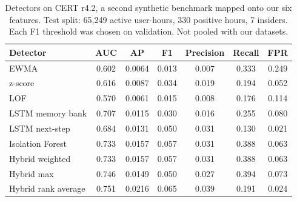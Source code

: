 \begin{table}[t]
\centering
\scriptsize
\caption{Detectors on CERT r4.2, a second synthetic benchmark mapped onto our six features. Test split: 65,249 active user-hours, 330 positive hours, 7 insiders. Each F1 threshold was chosen on validation. Not pooled with our datasets.}
\label{tab:cert}
\begin{tabular}{lcccccc}
\hline
Detector & AUC & AP & F1 & Precision & Recall & FPR \\
\hline
EWMA & 0.602 & 0.0064 & 0.013 & 0.007 & 0.333 & 0.249 \\
z-score & 0.616 & 0.0087 & 0.034 & 0.019 & 0.194 & 0.052 \\
LOF & 0.570 & 0.0061 & 0.015 & 0.008 & 0.176 & 0.114 \\
LSTM memory bank & 0.707 & 0.0115 & 0.030 & 0.016 & 0.255 & 0.080 \\
LSTM next-step & 0.684 & 0.0131 & 0.050 & 0.031 & 0.130 & 0.021 \\
Isolation Forest & 0.733 & 0.0157 & 0.057 & 0.031 & 0.388 & 0.063 \\
Hybrid weighted & 0.733 & 0.0157 & 0.057 & 0.031 & 0.388 & 0.063 \\
Hybrid max & 0.746 & 0.0149 & 0.050 & 0.027 & 0.394 & 0.073 \\
Hybrid rank average & 0.751 & 0.0216 & 0.065 & 0.039 & 0.191 & 0.024 \\
\hline
\end{tabular}
\end{table}
